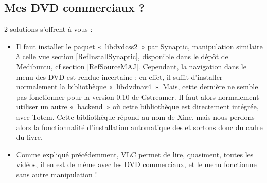 \subsection{Mes DVD commerciaux ?}
\label{RefLireDVD}
2 solutions s'offrent à vous :
\begin{itemize}
\item Il faut installer le paquet «~libdvdcss2~» par Synaptic, manipulation similaire à celle vue section \ref{RefInstallSynaptic}, disponible dans le dépôt de Medibuntu, cf section \ref{RefSourceMAJ}. Cependant, la navigation dans le menu des DVD est rendue incertaine : en effet, il suffit d'installer normalement la bibliothèque «~libdvdnav4~». Mais, cette dernière ne semble pas fonctionner pour la version 0.10 de Gstreamer. Il faut alors normalement utiliser un autre «~backend~» où cette bibliothèque est directement intégrée, avec Totem. Cette bibliothèque répond au nom de Xine, mais nous perdons alors la fonctionnalité d'installation automatique des  et sortons donc du cadre du livre.
\item Comme expliqué précédemment, VLC permet de lire, quasiment, toutes les vidéos, il en est de même avec les DVD commerciaux, et le menu fonctionne sans autre manipulation !
\end{itemize}
